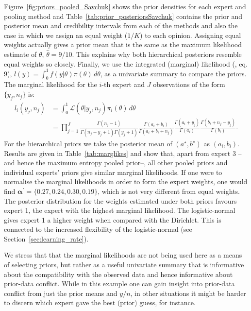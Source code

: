 \documentclass[a4paper, notitlepage, 10pt]{article}
\begin{document}
Figure~\ref{fig:priors_pooled_Savchuk} shows the prior densities for each expert and pooling method and Table~\ref{tab:prior_posteriorsSavchuk} contains the prior and posterior mean and credibility intervals from each of the methods and also the case in which we assign an equal weight ($1/K$) to each opinion.
Assigning equal weights actually gives a prior mean that is the same as the maximum likelihood estimate of $\theta$, $\hat{\theta} = 9/ 10$.
This explains why both hierarchical posteriors resemble equal weights so closely.
Finally, we use the integrated (marginal) likelihood (\cite{Raftery2007}, eq. 9), $l(y) = \int_{0}^{1}f(y|\theta)\pi(\theta)\, d\theta$, as a univariate summary to compare the priors.
The marginal likelihood for the $i$-th expert and $J$ observations of the form $\{ y_j, n_j\}$ is:
\begin{align}
  \label{eq:marglike}
l_i(y_j, n_j) &= \int_{0}^{1}\mathcal{L}(\theta|y_j, n_j)\pi_i(\theta)\, d\theta\nonumber\\
 &= \prod_{j = 1}^{J}\frac{\Gamma(n_j-1)}{\Gamma(n_j-y_j + 1)\Gamma(y_j+1)}\frac{\Gamma(a_i + b_i)}{\Gamma(a_i + b_i + n_j)}\frac{\Gamma(a_i + y_j)}{\Gamma(a_i)}\frac{\Gamma(b_i + n_j - y_j) }{\Gamma(b_i)}.
 \end{align}
For the hierarchical priors we take the posterior mean of $(a^\star, b^\star)$ as $(a_i, b_i)$.
Results are given in Table~\ref{tab:marglikes} and show that, apart from expert $3$ -- and hence the maximum entropy pooled prior--, all other pooled priors and individual experts' priors give similar marginal likelihoods.
If one were to normalise the marginal likelihoods in order to form the expert weights, one would find $\boldsymbol\alpha^\prime = \{0.27, 0.24, 0.30, 0.19 \}$, which is not very different from equal weights.
The posterior distribution for the weights estimated under both priors favours expert 1, the expert with the highest marginal likelihood.
The logistic-normal gives expert 1 a higher weight when compared with the Dirichlet.
This is connected to the increased flexibility of the logistic-normal (see Section~\ref{sec:learning_rate}).

We stress that that the marginal likelihoods are not being used here as a means of selecting priors, but rather as a useful univariate summary that is informative about the compatibility with the observed data and hence informative about prior-data conflict.
While in this example one can gain insight into prior-data conflict from just the prior means and $y/n$, in other situations it might be harder to discern which expert gave the best (prior) guess, for instance.
\end{document}
